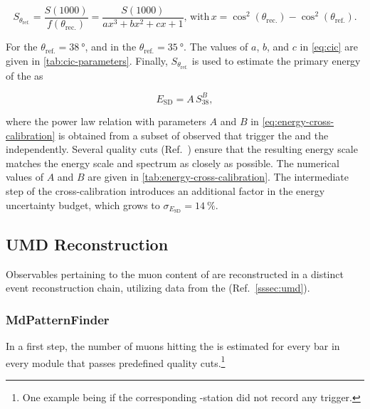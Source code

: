 \begin{equation}
\label{eq:cic}
S_{\theta_\mathrm{ref.}} = \frac{S(1000)}{f(\theta_\mathrm{rec.})} = \frac{S(1000)}{ax^3 + bx^2 + cx + 1},\,\mathrm{with}\,x=\cos^2(\theta_\mathrm{rec.})-\cos^2(\theta_\mathrm{ref.}).
\end{equation}

For the  $\theta_\mathrm{ref.} = \SI{38}{\degree}$, and in the  
$\theta_\mathrm{ref.} = \SI{35}{\degree}$. The values of $a$, $b$, and $c$ in 
\cref{eq:cic} are given in \cref{tab:cic-parameters}. Finally, 
$S_{\theta_\mathrm{ref.}}$ is used to estimate the primary energy of the \EAS 
as

\begin{equation}
\label{eq:energy-cross-calibration}
E_\mathrm{SD} = A\,S_{38}^B,
\end{equation}

where the power law relation with parameters $A$ and $B$ in 
\cref{eq:energy-cross-calibration} is obtained from a subset of observed \EAS 
that trigger the \FD and the \SD independently. Several quality cuts (Ref.\ 
\cite{aabReconstructionEventsRecorded2020}) ensure that the resulting \SD 
energy scale matches the \FD energy scale and spectrum as closely as possible.
The numerical values of $A$ and $B$ are given in 
\cref{tab:energy-cross-calibration}. The intermediate step of the 
cross-calibration introduces an additional factor in the energy uncertainty 
budget, which grows to $\sigma_{E_\mathrm{SD}}=\SI{14}{\percent}$. 

\subsection{UMD Reconstruction}
\label{ssec:umd-reconstruction}

Observables pertaining to the muon content of \EASs are reconstructed in a 
distinct event reconstruction chain, utilizing data from the \UMD (Ref.\ 
\cref{sssec:umd}).

\subsubsection{MdPatternFinder}
\label{sssec:umd-reconstruction-patterns}

In a first step, the number of muons hitting the \UMD is estimated for every 
bar in every module that passes predefined quality cuts.\footnote{One 
example being if the corresponding \SD-station did not record any trigger.}

